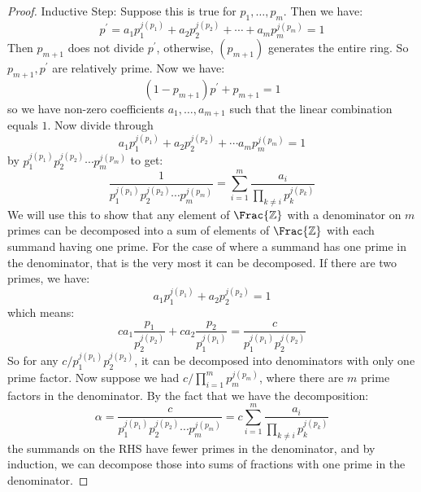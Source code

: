 \documentclass{article}
\begin{document}
\begin{itemize}
\begin{proof}
                Inductive Step: Suppose this is true for $p_{1}, \ldots , p_{m}$. Then we have:
                    \begin{equation*}
                        p^{\prime} = a_{1}p_{1}^{j(p_{1})} + a_{2}p_{2}^{j(p_{2})} + \cdots +a_{m}p_{m}^{j(p_{m})} = 1
                    \end{equation*}
                Then $p_{m + 1}$ does not divide $p^{\prime}$, otherwise, $(p_{m + 1})$ generates the entire ring. So $p_{m + 1}, p^{\prime}$ are relatively prime. Now we have:
                    \begin{equation*}
                        (1 - p_{m + 1})p^{\prime} + p_{m + 1} = 1
                    \end{equation*}
                so we have non-zero coefficients $a_{1}, \ldots , a_{m + 1}$ such that the linear combination equals $1$. Now divide through 
                    \begin{equation*}
                        a_{1}p_{1}^{j(p_{1})} + a_{2}p_{2}^{j(p_{2})} + \cdots a_{m}p_{m}^{j(p_{m})} = 1
                    \end{equation*}
                by $p_{1}^{j(p_{1})}p_{2}^{j(p_{2})}\cdots p_{m}^{j(p_{m})}$ to get:
                    \begin{equation*}
                        \dfrac{1}{p_{1}^{j(p_{1})}p_{2}^{j(p_{2})}\cdots p_{m}^{j(p_{m})}} = \sum_{i = 1}^{m} \dfrac{a_{i}}{\prod_{k \neq i}p_{k}^{j(p_{k})}}
                    \end{equation*}
                We will use this to show that any element of $\Frac{\mathbb{Z}}$ with a denominator on $m$ primes can be decomposed into a sum of elements of $\Frac{\mathbb{Z}}$ with each summand having one prime. For the case of where a summand has one prime in the denominator, that is the very most it can be decomposed. If there are two primes, we have:
                    \begin{equation*}
                        a_{1}p_{1}^{j(p_{1})} + a_{2}p_{2}^{j(p_{2})} = 1
                    \end{equation*}
                which means:
                    \begin{equation*}
                        ca_{1}\dfrac{p_{1}}{p_{2}^{j(p_{2})}} + ca_{2}\dfrac{p_{2}}{p_{1}^{j(p_{1})}} = \dfrac{c}{p_{1}^{j(p_{1})}p_{2}^{j(p_{2})}}
                    \end{equation*}
                So for any $c/p_{1}^{j(p_{1})}p_{2}^{j(p_{2})}$, it can be decomposed into denominators with only one prime factor. Now suppose we had $c/\prod_{i = 1}^{m}p_{m}^{j(p_{m})}$, where there are $m$ prime factors in the denominator. By the fact that we have the decomposition:
                    \begin{equation*}
                        \alpha = \dfrac{c}{p_{1}^{j(p_{1})}p_{2}^{j(p_{2})}\cdots p_{m}^{j(p_{m})}} = c\sum_{i = 1}^{m} \dfrac{a_{i}}{\prod_{k \neq i}p_{k}^{j(p_{k})}}
                    \end{equation*}
                the summands on the RHS have fewer primes in the denominator, and by induction, we can decompose those into sums of fractions with one prime in the denominator.


\end{proof}
\end{itemize}
\end{document}
